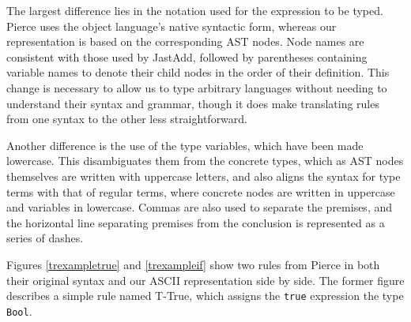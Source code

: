 \documentclass[nofilelist]{cslthse-msc}
\newcommand{\CR}[1]{\textcolor{green!60!black}{[\textbf{CR}:#1]}}
\begin{document}
The largest difference lies in the notation used for the expression to be typed.
Pierce uses the object language's native syntactic form, whereas our representation is based on the corresponding AST nodes.
Node names are consistent with those used by JastAdd, followed by parentheses containing variable names to denote their child nodes in the order of their definition.
This change is necessary to allow us to type arbitrary languages without needing to understand their syntax and grammar, though it does make translating rules from one syntax to the other less straightforward.

Another difference is the use of the type variables, which have been made lowercase.
This disambiguates them from the concrete types, which as AST nodes themselves are written with uppercase letters, and also aligns the syntax for type terms with that of regular terms, where concrete nodes are written in uppercase and variables in lowercase.
Commas are also used to separate the premises, and the horizontal line separating premises from the conclusion is represented as a series of dashes.



Figures \ref{trexampletrue} and \ref{trexampleif} show two rules from Pierce in both their original syntax and our ASCII representation side by side.
The former figure describes a simple rule named T-True, which assigns the \lstinline{true} expression the type \lstinline{Bool}.
\end{document}
